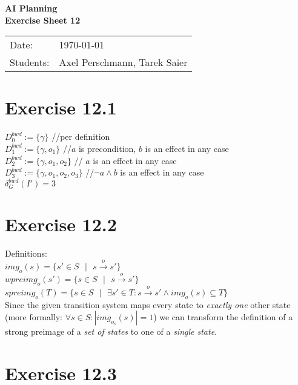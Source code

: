 \documentclass[11pt,a4paper]{article}
\newcommand{\sheetNr}{12}
\begin{document}
\begin{center}
\Huge{\textbf{AI Planning}}\\
\LARGE{\textbf{Exercise Sheet \sheetNr}}
\end{center}
\vspace{2cm}
\begin{tabular}{ll}
Date: & \today\\
Students: & Axel Perschmann, Tarek Saier
\end{tabular}

\section*{Exercise 12.1}
$D^{bwd}_0:=\{\gamma\}$ \hphantom{tabtab} //per definition\\
$D^{bwd}_1:=\{\gamma,o_1\}$ \hphantom{tabtab} //$a$ is precondition, $b$ is an effect in any case\\
$D^{bwd}_2:=\{\gamma,o_1,o_2\}$ \hphantom{tabtab} // $a$ is an effect in any case\\
$D^{bwd}_3:=\{\gamma,o_1,o_2,o_3\}$ \hphantom{tabtab} //$\neg a\land b$ is an effect in any case\\
$\delta^{bwd}_G(I')=3$

\section*{Exercise 12.2}
Definitions:\\
$img_o(s)=\{s'\in S\text{ }|\text{ }s\stackrel{o}{\to}s'\}$\\
$wpreimg_o(s')=\{s\in S\text{ }|\text{ }s\stackrel{o}{\to}s'\}$\\
$spreimg_o(T)=\{s\in S\text{ }|\text{ }\exists s'\in T:s\stackrel{o}{\to}s'\land img_o(s)\subseteq T\}$\\
Since the given transition system maps every state to \emph{exactly one} other state (more formally: $\forall s\in S:|img_{o_s}(s)|=1$) we can transform the definition of a strong preimage of a \emph{set of states} to one of a \emph{single state}.

\section*{Exercise 12.3}

\label{lastpage}
\end{document}
